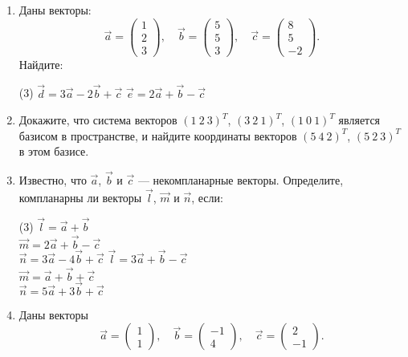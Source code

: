 \begin{enumerate}
    \item Даны векторы:
    \[
    \vec a =
    \begin{pmatrix}
    	1 \\ 2 \\ 3
    \end{pmatrix},
    \quad
    \vec b =
    \begin{pmatrix}
    	5 \\ 5 \\ 3
    \end{pmatrix},
    \quad
    \vec c = 
	\begin{pmatrix}
    	8 \\ 5 \\ -2
    \end{pmatrix}.
   \]
   Найдите:
   \begin{tasks}(3)
       \task $\vec d = 3 \vec a -2 \vec b + \vec c$
       \task $\vec e = 2 \vec a + \vec b - \vec c$
   \end{tasks}
   
   \item Докажите, что система векторов
	    $(1\ 2\ 3)^T$,
	    $(3\ 2\ 1)^T$,
	    $(1\ 0\ 1)^T$
	    является базисом в пространстве, и найдите координаты векторов 
	    $(5\ 4\ 2)^T$,
	    $(5\ 2\ 3)^T$
	    в этом базисе.
	    
	\item Известно, что $\vec a$, $\vec b$ и $\vec c$ --- некомпланарные векторы. Определите, компланарны ли векторы $\vec l$, $\vec m$ и $\vec n$, если:
		\begin{tasks}(3)
	       \task $\vec l = \vec a + \vec b$\\
	      	 	 $\vec m = 2 \vec a + \vec b - \vec c$\\
	      	 	 $\vec n = 3 \vec a -4 \vec b + \vec c$
	       \task $\vec l = 3 \vec a + \vec b - \vec c$\\
	      	 	 $\vec m =  \vec a + \vec b + \vec c$\\
	      	 	 $\vec n = 5 \vec a +3 \vec b + \vec c$
	    \end{tasks}
	    
	\item Даны векторы
	$$\vec a = \begin{pmatrix}
	    	1 \\ 1
	    \end{pmatrix},\quad
	   \vec b = \begin{pmatrix}
	    	-1 \\ 4
	    \end{pmatrix},\quad
	    \vec c = \begin{pmatrix}
	    	2 \\ -1
	    \end{pmatrix}.$$
	  

\end{enumerate}
